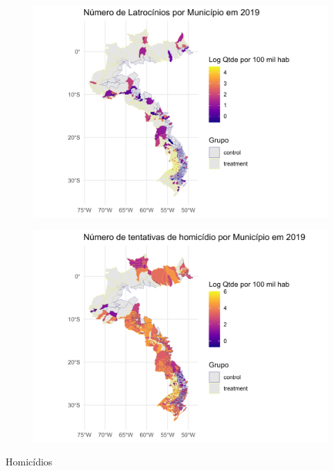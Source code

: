 \documentclass{beamer}
\begin{document}
\begin{frame}
	\begin{figure}
		\centering
		\includegraphics[width=1\linewidth]{figures/mapa_latrocinios}
		\label{fig:histoghom}
	\end{figure}
\end{frame}

\begin{frame}
	\begin{figure}
		\centering
		\includegraphics[width=1\linewidth]{figures/mapa_tentativas}
		\label{fig:histoghom}
	\end{figure}
\end{frame}

\begin{frame}{Homicídios}
	
\end{frame}
\end{document}
